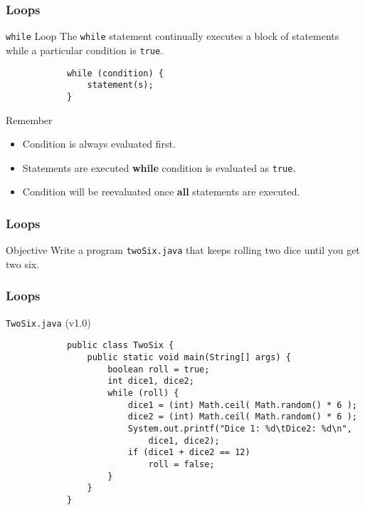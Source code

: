 \documentclass[10pt, compress]{beamer}
\begin{document}
\begin{frame}[fragile]
	\frametitle{Loops}
	\begin{block}{\texttt{while} Loop}
		The \texttt{while} statement continually executes a block of statements while a particular condition is \texttt{true}.
		\begin{verbatim}
			while (condition) {
			    statement(s);
			}
		\end{verbatim}
	\end{block}
	\begin{block}{Remember}
		\begin{itemize}
			\item[] Condition is always evaluated first.
			\item[] Statements are executed \textbf{while} condition is evaluated as \texttt{true}.
			\item[] Condition will be reevaluated once \textbf{all} statements are executed.
		\end{itemize}
	\end{block}
\end{frame}

\begin{frame}[fragile]
	\frametitle{Loops}
	\begin{block}{Objective}
		Write a program \texttt{twoSix.java} that keeps rolling two dice until you get two six.
	\end{block}
\end{frame}

\begin{frame}[fragile]
	\frametitle{Loops}
	\begin{block}{\texttt{TwoSix.java} (v1.0)}
		\begin{verbatim}
			public class TwoSix {
			    public static void main(String[] args) {
			        boolean roll = true;
			        int dice1, dice2;
			        while (roll) {
			            dice1 = (int) Math.ceil( Math.random() * 6 );
			            dice2 = (int) Math.ceil( Math.random() * 6 );
			            System.out.printf("Dice 1: %d\tDice2: %d\n",
			                dice1, dice2);
			            if (dice1 + dice2 == 12)
			                roll = false;
			        }
			    }
			}
		\end{verbatim}
	\end{block}
\end{frame}
\end{document}
